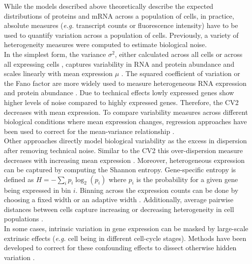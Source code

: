 While the models described above theoretically describe the expected distributions of proteins and mRNA across a population of cells, in practice, absolute measures (\emph{e.g.} transcript counts or fluorescence intensity) have to be used to quantify variation across a population of cells. Previously, a variety of heterogeneity measures were computed to estimate biological noise. \\
In the simplest form, the variance $\sigma^2$, either calculated across all cells or across all expressing cells \citep{Shalek2014a}, captures variability in RNA and protein abundance and scales linearly with mean expression $\mu$ \citep{Dey2015a}. The squared coefficient of variation or the Fano factor are more widely used to measure heterogeneous RNA expression \citep{Brennecke2013, Jones2014} and protein abundance \citep{Newman2006}. Due to technical effects \citep{Brennecke2013} lowly expressed genes show higher levels of noise compared to highly expressed genes. Therefore, the CV2 decreases with mean expression. To compare variability measures across different biological conditions where mean expression changes, regression approaches have been used to correct for the mean-variance relationship \citep{Kolodziejczyk2015cell, Fan2016}. \\ 
Other approaches directly model biological variability as the excess in dispersion after removing technical noise. Similar to the CV2 this over-dispersion measure decreases with increasing mean expression \citep{Vallejos2015BASiCS}. Moreover, heterogeneous expression can be captured by computing the Shannon entropy. Gene-specific entropy is defined as $H=-\sum_i{}p_i\log_2(p_i)$ where $p_i$ is the probability for a given gene being expressed in bin $i$. Binning across the expression counts can be done by choosing a fixed width \citep{Richard2016} or an adaptive width \citep{Stumpf2017}. Additionally, average pairwise distances between cells capture increasing or decreasing heterogeneity in cell populations \citep{Mohammed2017}. \\ 
In some cases, intrinsic variation in gene expression can be masked by large-scale extrinsic effects (\emph{e.g.} cell being in different cell-cycle stages). Methods have been developed to correct for these confounding effects to dissect otherwise hidden variation \citep{Buettner2015 Buettner2017}. 
